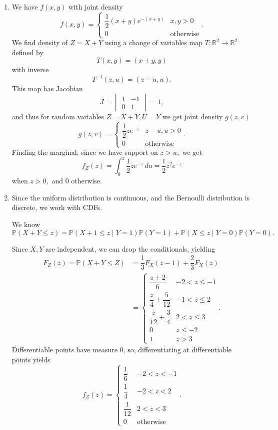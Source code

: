\documentclass[12pt]{article}
\begin{document}
\begin{enumerate}
  \item We have $f(x, y)$ with joint density
    $$
    f(x, y) =
    \begin{cases}
      \dfrac{1}{2}(x+y)e^{-(x+y)} & x, y > 0 \\
      0 & \text{otherwise}
    \end{cases}.
    $$
    We find density of $Z = X + Y$ using a change of variables map
    $T: \mathbb R^{2} \to \mathbb R^{2}$ defined by
    $$
    T(x, y) = (x + y, y)
    $$
    with inverse
    $$
    T^{-1}(z, u) = (z - u, u).
    $$
    This map has Jacobian
    $$
    J =
    \begin{vmatrix}
      1 & - 1 \\
      0 & 1
    \end{vmatrix} = 1,
    $$
    and thus for random variables $Z = X + Y, U = Y$ we get joint
    density $g(z, v)$
    $$
    g(z, v) =
    \begin{cases}
      \dfrac{1}{2}  ze^{-z} &  z - u, u > 0  \\
      0 & \text{otherwise}
    \end{cases}.
    $$
    Finding the marginal, since we have support on $z > u,$ we get
    $$
    f_Z(z) = \int_{0}^{z} \dfrac{1}{2}z e^{-z} \, du = \dfrac{1}{2}z^{2} e^{-z}
    $$
    when $z > 0,$ and $0$ otherwise.

  \item Since the uniform distribution is continuous, and the
    Bernoulli distribution is discrete, we work with CDFs.

    We know $$\mathbb P(X + Y \leq z) = \mathbb P(X + 1 \leq z  \mid
    Y = 1) \mathbb P(Y = 1) + \mathbb P(X \leq z \mid Y = 0) \mathbb P(Y = 0).$$

    Since $X, Y$ are independent, we can drop the conditionals, yielding
    \begin{align*}
      F_Z(z) = \mathbb P(X + Y \leq Z) &= \dfrac{1}{3}F_X(z - 1)  +
      \dfrac{2}{3} F_X(z) \\
      &=
      \begin{cases}
        \dfrac{z+2}{6} & -2 < z \leq -1 \\
        \dfrac{z}{4} + \dfrac{5}{12}  & -1 < z \leq 2 \\
        \dfrac{z}{12} + \dfrac{3}{4} & 2 <  z \leq 3 \\
        0 & z \leq -2 \\
        1 & z > 3
      \end{cases}.
    \end{align*}
    Differentiable points have measure 0, so, differentiating at
    differentiable points yields
    $$
    f_Z(z) =
    \begin{cases}
      \dfrac{1}{6} & -2 < z < -1\\
      \dfrac{1}{4}&  -2 < z < 2 \\
      \dfrac{1}{12}  & 2 < z < 3 \\
      0 & \text{otherwise}
    \end{cases}.
    $$


\end{enumerate}
\end{document}
